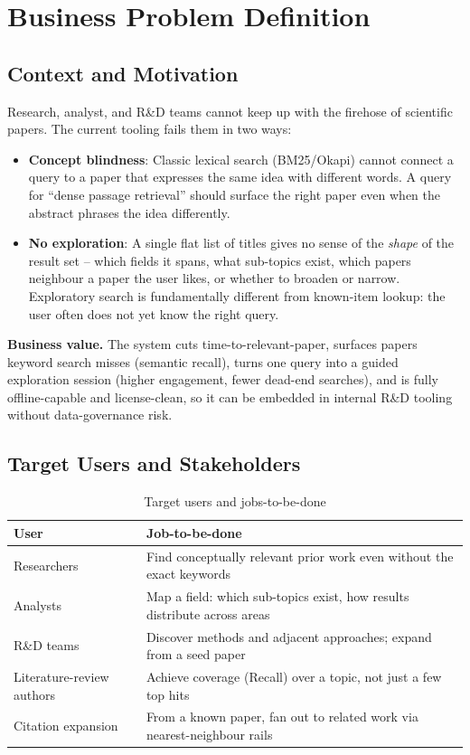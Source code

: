 \documentclass[12pt,a4paper]{article}
\begin{document}
\section{Business Problem Definition}

\subsection{Context and Motivation}

Research, analyst, and R\&D teams cannot keep up with the firehose of scientific papers. The current tooling fails them in two ways:
\begin{itemize}
  \item \textbf{Concept blindness}: Classic lexical search (BM25/Okapi) cannot connect a query to a paper that expresses the same idea with different words. A query for ``dense passage retrieval'' should surface the right paper even when the abstract phrases the idea differently.
  \item \textbf{No exploration}: A single flat list of titles gives no sense of the \emph{shape} of the result set -- which fields it spans, what sub-topics exist, which papers neighbour a paper the user likes, or whether to broaden or narrow. Exploratory search is fundamentally different from known-item lookup: the user often does not yet know the right query.
\end{itemize}

\textbf{Business value.} The system cuts time-to-relevant-paper, surfaces papers keyword search misses (semantic recall), turns one query into a guided exploration session (higher engagement, fewer dead-end searches), and is fully offline-capable and license-clean, so it can be embedded in internal R\&D tooling without data-governance risk.

\subsection{Target Users and Stakeholders}

\begin{table}[H]
\centering
\caption{Target users and jobs-to-be-done}
\small
\begin{tabularx}{\linewidth}{@{} l L @{}}
\toprule
\textbf{User} & \textbf{Job-to-be-done} \\
\midrule
Researchers & Find conceptually relevant prior work even without the exact keywords \\
Analysts & Map a field: which sub-topics exist, how results distribute across areas \\
R\&D teams & Discover methods and adjacent approaches; expand from a seed paper \\
Literature-review authors & Achieve coverage (Recall) over a topic, not just a few top hits \\
Citation expansion & From a known paper, fan out to related work via nearest-neighbour rails \\
\bottomrule
\end{tabularx}
\end{table}
\end{document}
